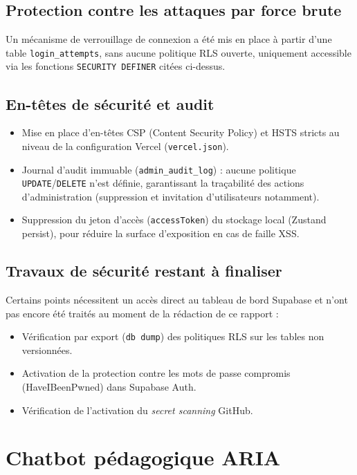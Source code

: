 \documentclass[12pt, a4paper]{report}
\begin{document}
\subsection{Protection contre les attaques par force brute}
Un mécanisme de verrouillage de connexion a été mis en place à partir d'une table \texttt{login\_attempts}, sans aucune politique RLS ouverte, uniquement accessible via les fonctions \texttt{SECURITY DEFINER} citées ci-dessus.

\subsection{En-têtes de sécurité et audit}
\begin{itemize}
    \item Mise en place d'en-têtes CSP (Content Security Policy) et HSTS stricts au niveau de la configuration Vercel (\texttt{vercel.json}).
    \item Journal d'audit immuable (\texttt{admin\_audit\_log}) : aucune politique \texttt{UPDATE}/\texttt{DELETE} n'est définie, garantissant la traçabilité des actions d'administration (suppression et invitation d'utilisateurs notamment).
    \item Suppression du jeton d'accès (\texttt{accessToken}) du stockage local (Zustand persist), pour réduire la surface d'exposition en cas de faille XSS.
\end{itemize}

\subsection{Travaux de sécurité restant à finaliser}
Certains points nécessitent un accès direct au tableau de bord Supabase et n'ont pas encore été traités au moment de la rédaction de ce rapport :
\begin{itemize}
    \item Vérification par export (\texttt{db dump}) des politiques RLS sur les tables non versionnées.
    \item Activation de la protection contre les mots de passe compromis (HaveIBeenPwned) dans Supabase Auth.
    \item Vérification de l'activation du \textit{secret scanning} GitHub.
\end{itemize}

\section{Chatbot pédagogique ARIA}
\end{document}
